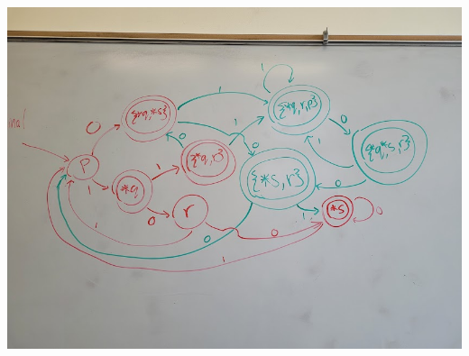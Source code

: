 \documentclass{article}
\theoremstyle{theorem}
\theoremstyle{definition}
\theoremstyle{remark}
\begin{document}
\\ \includegraphics[width=18cm, height=20cm]{Report Images/HW3_2.jpg}
\end{document}

